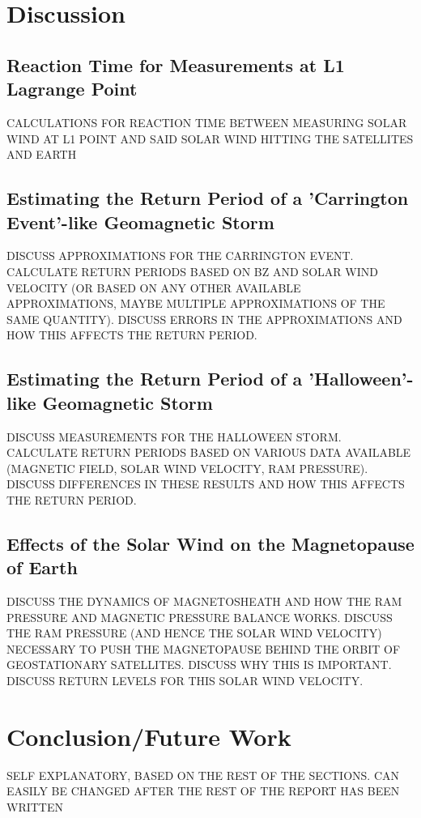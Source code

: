 \documentclass[12pt]{article}
\begin{document}
\section{Discussion}\label{sec:discussion}
    \subsection{Reaction Time for Measurements at L1 Lagrange Point}
        CALCULATIONS FOR REACTION TIME BETWEEN MEASURING SOLAR WIND AT L1 POINT AND SAID SOLAR WIND HITTING THE SATELLITES AND EARTH
    \subsection{Estimating the Return Period of a 'Carrington Event'-like Geomagnetic Storm}\label{sec:carrington}
        DISCUSS APPROXIMATIONS FOR THE CARRINGTON EVENT. CALCULATE RETURN PERIODS BASED ON BZ AND SOLAR WIND VELOCITY (OR BASED ON ANY OTHER AVAILABLE APPROXIMATIONS, MAYBE MULTIPLE APPROXIMATIONS OF THE SAME QUANTITY). DISCUSS ERRORS IN THE APPROXIMATIONS AND HOW THIS AFFECTS THE RETURN PERIOD.
    \subsection{Estimating the Return Period of a 'Halloween'-like Geomagnetic Storm}\label{sec:halloween}
        DISCUSS MEASUREMENTS FOR THE HALLOWEEN STORM. CALCULATE RETURN PERIODS BASED ON VARIOUS DATA AVAILABLE (MAGNETIC FIELD, SOLAR WIND VELOCITY, RAM PRESSURE). DISCUSS DIFFERENCES IN THESE RESULTS AND HOW THIS AFFECTS THE RETURN PERIOD.
    \subsection{Effects of the Solar Wind on the Magnetopause of Earth}\label{sec:magnetoPAUSE}
        DISCUSS THE DYNAMICS OF MAGNETOSHEATH AND HOW THE RAM PRESSURE AND MAGNETIC PRESSURE BALANCE WORKS. DISCUSS THE RAM PRESSURE (AND HENCE THE SOLAR WIND VELOCITY) NECESSARY TO PUSH THE MAGNETOPAUSE BEHIND THE ORBIT OF GEOSTATIONARY SATELLITES. DISCUSS WHY THIS IS IMPORTANT. DISCUSS RETURN LEVELS FOR THIS SOLAR WIND VELOCITY.
\section{Conclusion/Future Work}\label{sec:conclusions}
    SELF EXPLANATORY, BASED ON THE REST OF THE SECTIONS. CAN EASILY BE CHANGED AFTER THE REST OF THE REPORT HAS BEEN WRITTEN
\newpage
{}



\end{document}
